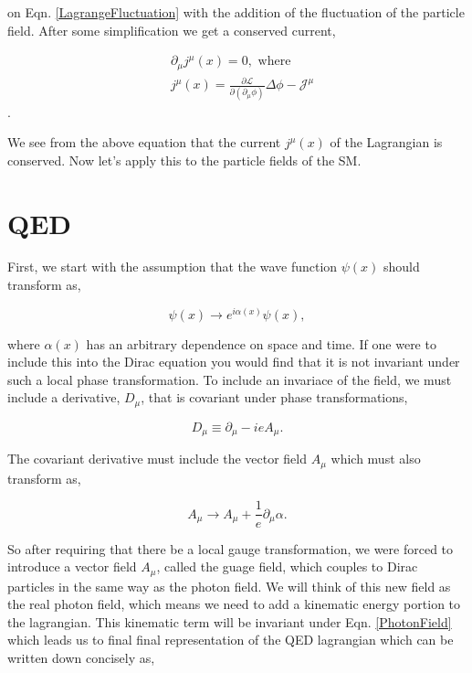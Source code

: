  on Eqn. \ref{LagrangeFluctuation} with the addition of the fluctuation of the particle field. After some simplification we get a conserved current,
 
 \begin{equation}
 \begin{split}
 & \partial_\mu j^\mu(x)=0, \text{ where}\\
 & j^\mu(x)=\frac{\partial\mathcal{L}}{\partial(\partial_\mu\phi)}\Delta\phi-\mathcal{J}^\mu
 \end{split}
 \end{equation}.
 
 We see from the above equation that the current $j^\mu(x)$ of the Lagrangian is conserved. Now let's apply this to the particle fields of the SM.
 
 \section{QED}
 
 First, we start with the assumption that the wave function $\psi(x)$ should transform as,
 
 \begin{equation}\label{U1gauge}
 \psi(x)\rightarrow e^{i\alpha(x)}\psi(x),
 \end{equation}
 
 where $\alpha(x)$ has an arbitrary dependence on space and time. If one were to include this into the Dirac equation you would find that it is not invariant under such a local phase transformation. To include an invariace of the field, we must include a derivative, $D_\mu$, that is covariant under phase transformations,
 
 \begin{equation}\label{QEDCovariantD}
 D_\mu\equiv\partial_\mu-ieA_\mu.
 \end{equation}
 
 The covariant derivative must include the vector field $A_\mu$ which must also transform as,
  
 \begin{equation}\label{PhotonField}
 A_\mu\rightarrow A_\mu+\frac{1}{e}\partial_\mu\alpha.
 \end{equation}
 
 So after requiring that there be a local gauge transformation, we were forced to introduce a vector field $A_\mu$, called the guage field, which couples to Dirac particles in the same way as the photon field. We will think of this new field as the real photon field, which means we need to add a kinematic energy portion to the lagrangian. This kinematic term will be invariant under Eqn. \ref{PhotonField} which leads us to final final representation of the QED lagrangian which can be written down concisely as, 
 
